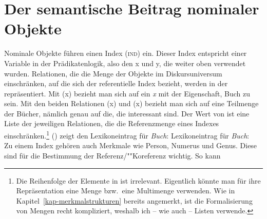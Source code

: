 \section{Der semantische Beitrag nominaler Objekte}
\label{sec-index}

Nominale Objekte führen einen Index (\textsc{ind}) ein. Dieser Index entspricht einer Variable in
der Prädikatenlogik, also den x und y, die weiter oben verwendet wurden. Relationen, die die Menge
der Objekte im Diskursuniversum einschränken, auf die sich der referentielle Index bezieht, werden
in der \relsl{} repräsentiert. Mit (x) bezieht man sich auf ein \emph{x} mit der
Eigenschaft, Buch zu sein. Mit den beiden Relationen (x) und (x)
bezieht man sich auf eine Teilmenge der Bücher, nämlich genau auf die, die interessant sind.
Der Wert von \rels ist eine Liste der jeweiligen Relationen, die die Referenzmenge eines Indexes einschränken.\footnote{
  Die Reihenfolge der Elemente in \rels ist irrelevant. Eigentlich könnte man für ihre
  Repräsentation eine Menge bzw.\ eine Multimenge verwenden. Wie in Kapitel~\ref{kap-merkmalstrukturen} bereits angemerkt, ist die
  Formalisierung von Mengen recht kompliziert, weshalb ich -- wie \citeauthor*{CFPS2005a} auch – Listen verwende.%
}
() zeigt den Lexikoneintrag für \emph{Buch}:
\eas
\label{le-buch}%
Lexikoneintrag für \emph{Buch}:\\
\zs
Zu einem Index gehören auch Merkmale wie Person, Numerus und Genus.
Diese sind für die Bestimmung der Referenz/""Koreferenz wichtig. So kann
